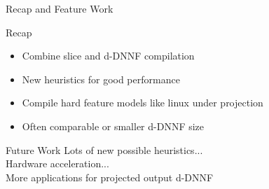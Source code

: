 \documentclass[
	aspectratio=169, %
	8pt, %
]{beamer}
\begin{document}
\begin{frame}{Recap and Feature Work}
    \begin{block}{Recap}
        \begin{itemize}
            \item Combine slice and d-DNNF compilation\pause
            \item New heuristics for good performance\pause
            \item Compile hard feature models like linux under projection \pause
            \item Often comparable or smaller d-DNNF size
        \end{itemize}
    \end{block}\pause
    \begin{block}{Future Work}
        Lots of new possible heuristics...\\ \pause
        Hardware acceleration...\\ \pause
        More applications for projected output d-DNNF \pause
    \end{block}

\end{frame}
\end{document}
